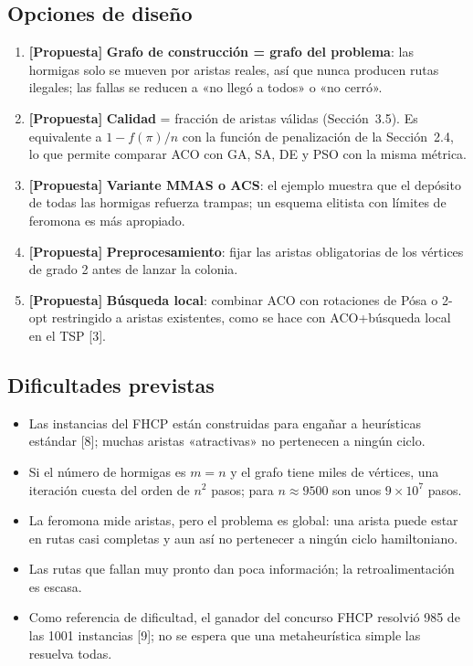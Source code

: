 \documentclass[11pt,letterpaper]{article}
\theoremstyle{definition}
\newcommand{\prop}{\textcolor{green!40!black}{\textbf{[Propuesta]}}}
\begin{document}
\subsection{Opciones de diseño}
\begin{enumerate}
  \item \prop{} \textbf{Grafo de construcción = grafo del problema}: las hormigas solo se
        mueven por aristas reales, así que nunca producen rutas ilegales; las fallas se
        reducen a «no llegó a todos» o «no cerró».
  \item \prop{} \textbf{Calidad} = fracción de aristas válidas (Sección~3.5). Es equivalente a
        $1-f(\pi)/n$ con la función de penalización de la Sección~2.4, lo que permite
        comparar ACO con GA, SA, DE y PSO con la misma métrica.
  \item \prop{} \textbf{Variante MMAS o ACS}: el ejemplo muestra que el depósito de todas las
        hormigas refuerza trampas; un esquema elitista con límites de feromona es más
        apropiado.
  \item \prop{} \textbf{Preprocesamiento}: fijar las aristas obligatorias de los vértices de
        grado 2 antes de lanzar la colonia.
  \item \prop{} \textbf{Búsqueda local}: combinar ACO con rotaciones de Pósa o 2-opt
        restringido a aristas existentes, como se hace con ACO+búsqueda local en el TSP [3].
\end{enumerate}

\subsection{Dificultades previstas}
\begin{itemize}[nosep]
  \item Las instancias del FHCP están construidas para engañar a heurísticas estándar [8];
        muchas aristas «atractivas» no pertenecen a ningún ciclo.
  \item Si el número de hormigas es $m=n$ y el grafo tiene miles de vértices, una iteración
        cuesta del orden de $n^2$ pasos; para $n\approx9500$ son unos $9\times10^7$ pasos.
  \item La feromona mide aristas, pero el problema es global: una arista puede estar en
        rutas casi completas y aun así no pertenecer a ningún ciclo hamiltoniano.
  \item Las rutas que fallan muy pronto dan poca información; la retroalimentación es escasa.
  \item Como referencia de dificultad, el ganador del concurso FHCP resolvió 985 de las
        1001 instancias [9]; no se espera que una metaheurística simple las resuelva todas.
\end{itemize}
\end{document}
